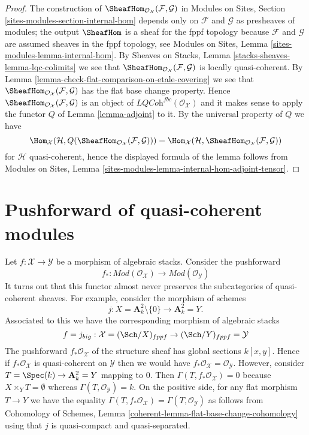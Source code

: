 \begin{proof}
The construction of
$\SheafHom_{\mathcal{O}_\mathcal{X}}(\mathcal{F}, \mathcal{G})$ in
Modules on Sites, Section \ref{sites-modules-section-internal-hom}
depends only on $\mathcal{F}$ and $\mathcal{G}$ as presheaves
of modules; the output $\SheafHom$ is a sheaf for the fppf
topology because $\mathcal{F}$ and $\mathcal{G}$ are assumed
sheaves in the fppf topology, see
Modules on Sites, Lemma \ref{sites-modules-lemma-internal-hom}.
By Sheaves on Stacks, Lemma \ref{stacks-sheaves-lemma-lqc-colimits}
we see that $\SheafHom_{\mathcal{O}_\mathcal{X}}(\mathcal{F}, \mathcal{G})$
is locally quasi-coherent.
By Lemma \ref{lemma-check-flat-comparison-on-etale-covering}
we see that $\SheafHom_{\mathcal{O}_\mathcal{X}}(\mathcal{F}, \mathcal{G})$
has the flat base change property. Hence
$\SheafHom_{\mathcal{O}_\mathcal{X}}(\mathcal{F}, \mathcal{G})$
is an object of $\textit{LQCoh}^{fbc}(\mathcal{O}_\mathcal{X})$
and it makes sense to apply the functor $Q$ of Lemma \ref{lemma-adjoint}
to it. By the universal property of $Q$ we have
$$
\Hom_\mathcal{X}(\mathcal{H},
Q(\SheafHom_{\mathcal{O}_\mathcal{X}}(\mathcal{F}, \mathcal{G}))) =
\Hom_\mathcal{X}(\mathcal{H},
\SheafHom_{\mathcal{O}_\mathcal{X}}(\mathcal{F}, \mathcal{G}))
$$
for $\mathcal{H}$ quasi-coherent, hence the displayed formula 
of the lemma follows from Modules on Sites, Lemma
\ref{sites-modules-lemma-internal-hom-adjoint-tensor}.
\end{proof}










\section{Pushforward of quasi-coherent modules}
\label{section-pushforward-quasi-coherent}

\noindent
Let $f : \mathcal{X} \to \mathcal{Y}$ be a morphism of algebraic stacks.
Consider the pushforward
$$
f_* :
\textit{Mod}(\mathcal{O}_\mathcal{X})
\longrightarrow
\textit{Mod}(\mathcal{O}_\mathcal{Y})
$$
It turns out that this functor almost never preserves the subcategories
of quasi-coherent sheaves. For example, consider the morphism of schemes
$$
j : X = \mathbf{A}^2_k \setminus \{0\} \longrightarrow \mathbf{A}^2_k = Y.
$$
Associated to this we have the corresponding morphism of algebraic stacks
$$
f = j_{big} : \mathcal{X} = (\Sch/X)_{fppf} \to
(\Sch/Y)_{fppf} = \mathcal{Y}
$$
The pushforward $f_*\mathcal{O}_\mathcal{X}$ of the structure sheaf has
global sections $k[x, y]$. Hence if $f_*\mathcal{O}_\mathcal{X}$ is
quasi-coherent on $\mathcal{Y}$ then we would have
$f_*\mathcal{O}_\mathcal{X} = \mathcal{O}_\mathcal{Y}$. However,
consider $T = \Spec(k) \to \mathbf{A}^2_k = Y$ mapping to $0$.
Then $\Gamma(T, f_*\mathcal{O}_\mathcal{X}) = 0$ because
$X \times_Y T = \emptyset$ whereas $\Gamma(T, \mathcal{O}_\mathcal{Y}) = k$.
On the positive side, for any flat morphism $T \to Y$ we have the equality
$\Gamma(T, f_*\mathcal{O}_\mathcal{X}) = \Gamma(T, \mathcal{O}_\mathcal{Y})$
as follows from
Cohomology of Schemes, Lemma \ref{coherent-lemma-flat-base-change-cohomology}
using that $j$ is quasi-compact and quasi-separated.

